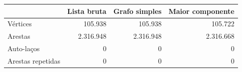 \begin{tabular}{lrrr}
\toprule
 & Lista bruta & Grafo simples & Maior componente \\
\midrule
Vértices & 105.938 & 105.938 & 105.722 \\
Arestas & 2.316.948 & 2.316.948 & 2.316.668 \\
Auto-laços & 0 & 0 & 0 \\
Arestas repetidas & 0 & 0 & 0 \\
\bottomrule
\end{tabular}
